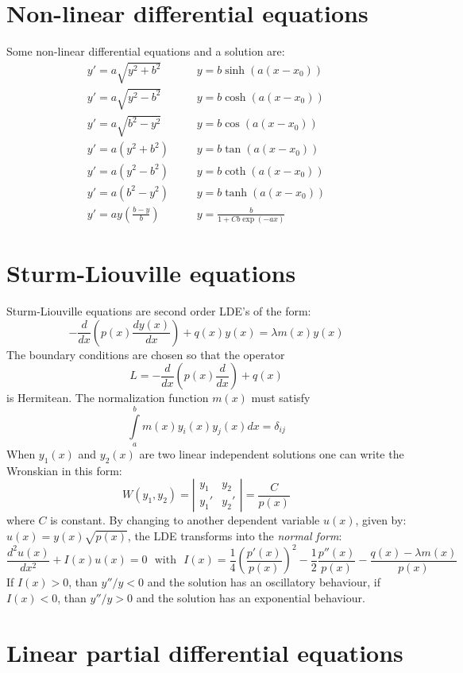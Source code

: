 \documentclass[twoside]{report}
\begin{document}
\section{Non-linear differential equations}
Some non-linear differential equations and a solution are:
\[
\begin{array}{lll}
y'=a\sqrt{y^2+b^2}&~~~~&y=b\sinh(a(x-x_0))\\
y'=a\sqrt{y^2-b^2}&~~~~&y=b\cosh(a(x-x_0))\\
y'=a\sqrt{b^2-y^2}&~~~~&y=b\cos(a(x-x_0))\\
y'=a(y^2+b^2)     &~~~~&y=b\tan(a(x-x_0))\\
y'=a(y^2-b^2)     &~~~~&y=b\coth(a(x-x_0))\\
y'=a(b^2-y^2)     &~~~~&y=b\tanh(a(x-x_0))\\
\displaystyle y'=ay\left(\frac{b-y}{b}\right)&~~~~&\displaystyle y=\frac{b}{1+Cb\exp(-ax)}
\end{array}
\]

\section{Sturm-Liouville equations}
Sturm-Liouville equations are second order LDE's of the form:
\[
-\frac{d}{dx}\left(p(x)\frac{dy(x)}{dx}\right)+q(x)y(x)=\lambda m(x)y(x)
\]
The boundary conditions are chosen so that the operator
\[
L=-\frac{d}{dx}\left(p(x)\frac{d}{dx}\right)+q(x)
\]
is Hermitean. The normalization function $m(x)$ must satisfy
\[
\int\limits_a^bm(x)y_i(x)y_j(x)dx=\delta_{ij}
\]
When $y_1(x)$ and $y_2(x)$ are two linear independent solutions one can write
the Wronskian in this form:
\[
W(y_1,y_2)=\left|\begin{array}{cc}y_1&y_2\\ y_1'&y_2' \end{array}\right|=
\frac{C}{p(x)}
\]
where $C$ is constant. By changing to another dependent variable $u(x)$,
given by: $u(x)=y(x)\sqrt{p(x)}$, the LDE transforms into the
{\it normal form}:
\[
\frac{d^2u(x)}{dx^2}+I(x)u(x)=0~~~\mbox{with}~~~
I(x)=\frac{1}{4}\left(\frac{p'(x)}{p(x)}\right)^2-\frac{1}{2}\frac{p''(x)}{p(x)}-\frac{q(x)-\lambda m(x)}{p(x)}
\]
If $I(x)>0$, than $y''/y<0$ and the solution has an oscillatory behaviour,
if $I(x)<0$, than $y''/y>0$ and the solution has an exponential behaviour.

\section{Linear partial differential equations}
\end{document}
